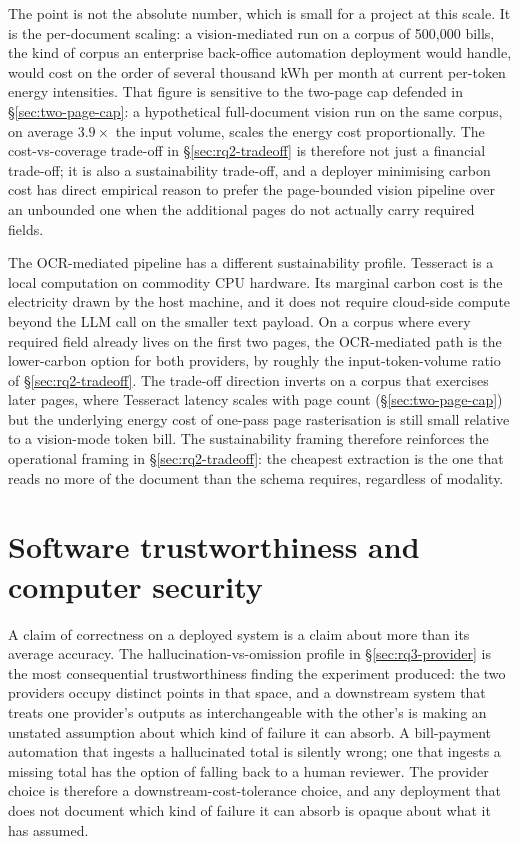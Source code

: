 The point is not the absolute number, which is small for a project at this
scale. It is the per-document scaling: a vision-mediated run on a corpus of
500{,}000 bills, the kind of corpus an enterprise back-office automation
deployment would handle, would cost on the order of several thousand kWh per
month at current per-token energy intensities. That figure is sensitive to the
two-page cap defended in \S\ref{sec:two-page-cap}: a hypothetical full-document
vision run on the same corpus, on average $3.9\times$ the input volume, scales
the energy cost proportionally. The cost-vs-coverage trade-off in
\S\ref{sec:rq2-tradeoff} is therefore not just a financial trade-off; it is also
a sustainability trade-off, and a deployer minimising carbon cost has direct
empirical reason to prefer the page-bounded vision pipeline over an unbounded
one when the additional pages do not actually carry required fields.

The OCR-mediated pipeline has a different sustainability profile. Tesseract is a
local computation on commodity CPU hardware. Its marginal carbon cost is the
electricity drawn by the host machine, and it does not require cloud-side
compute beyond the LLM call on the smaller text payload. On a corpus where every
required field already lives on the first two pages, the OCR-mediated path is
the lower-carbon option for both providers, by roughly the input-token-volume
ratio of \S\ref{sec:rq2-tradeoff}. The trade-off direction inverts on a corpus
that exercises later pages, where Tesseract latency scales with page count
(\S\ref{sec:two-page-cap}) but the underlying energy cost of one-pass page
rasterisation is still small relative to a vision-mode token bill. The
sustainability framing therefore reinforces the operational framing in
\S\ref{sec:rq2-tradeoff}: the cheapest extraction is the one that reads no more
of the document than the schema requires, regardless of modality.

\section{Software trustworthiness and computer security}
\label{sec:lsesp-trust}

A claim of correctness on a deployed system is a claim about more than its
average accuracy. The hallucination-vs-omission profile in
\S\ref{sec:rq3-provider} is the most consequential trustworthiness finding the
experiment produced: the two providers occupy distinct points in that space, and
a downstream system that treats one provider's outputs as interchangeable with
the other's is making an unstated assumption about which kind of failure it can
absorb. A bill-payment automation that ingests a hallucinated total is silently
wrong; one that ingests a missing total has the option of falling back to a
human reviewer. The provider choice is therefore a downstream-cost-tolerance
choice, and any deployment that does not document which kind of failure it can
absorb is opaque about what it has assumed.

